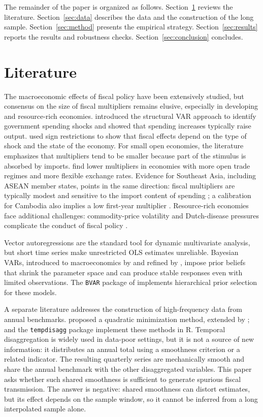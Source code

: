 \documentclass[11pt,a4paper]{article}
\begin{document}
The remainder of the paper is organized as follows. Section~\ref{sec:literature} reviews the literature. Section~\ref{sec:data} describes the data and the construction of the long sample. Section~\ref{sec:method} presents the empirical strategy. Section~\ref{sec:results} reports the results and robustness checks. Section~\ref{sec:conclusion} concludes.

\section{Literature}
\label{sec:literature}

The macroeconomic effects of fiscal policy have been extensively studied, but consensus on the size of fiscal multipliers remains elusive, especially in developing and resource-rich economies. \textcite{blanchard2002} introduced the structural VAR approach to identify government spending shocks and showed that spending increases typically raise output. \textcite{mountford2009} used sign restrictions to show that fiscal effects depend on the type of shock and the state of the economy. For small open economies, the literature emphasizes that multipliers tend to be smaller because part of the stimulus is absorbed by imports. \textcite{ilzetzki2013} find lower multipliers in economies with more open trade regimes and more flexible exchange rates. Evidence for Southeast Asia, including ASEAN member states, points in the same direction: fiscal multipliers are typically modest and sensitive to the import content of spending \parencite{tang2013,dime2021}; a calibration for Cambodia also implies a low first-year multiplier \parencite{baksa2020}. Resource-rich economies face additional challenges: commodity-price volatility and Dutch-disease pressures complicate the conduct of fiscal policy \parencite{frankel2012}.

Vector autoregressions are the standard tool for dynamic multivariate analysis, but short time series make unrestricted OLS estimates unreliable. Bayesian VARs, introduced to macroeconomics by \textcite{litterman1986} and refined by \textcite{giannone2015}, impose prior beliefs that shrink the parameter space and can produce stable responses even with limited observations. The \texttt{BVAR} package of \textcite{bvar2021} implements hierarchical prior selection for these models.

A separate literature addresses the construction of high-frequency data from annual benchmarks. \textcite{denton1971} proposed a quadratic minimization method, extended by \textcite{cholette1984}; \textcite{saxsteiner2013} and the \texttt{tempdisagg} package implement these methods in R. Temporal disaggregation is widely used in data-poor settings, but it is not a source of new information: it distributes an annual total using a smoothness criterion or a related indicator. The resulting quarterly series are mechanically smooth and share the annual benchmark with the other disaggregated variables. This paper asks whether such shared smoothness is sufficient to generate spurious fiscal transmission. The answer is negative: shared smoothness can distort estimates, but its effect depends on the sample window, so it cannot be inferred from a long interpolated sample alone.
\end{document}
